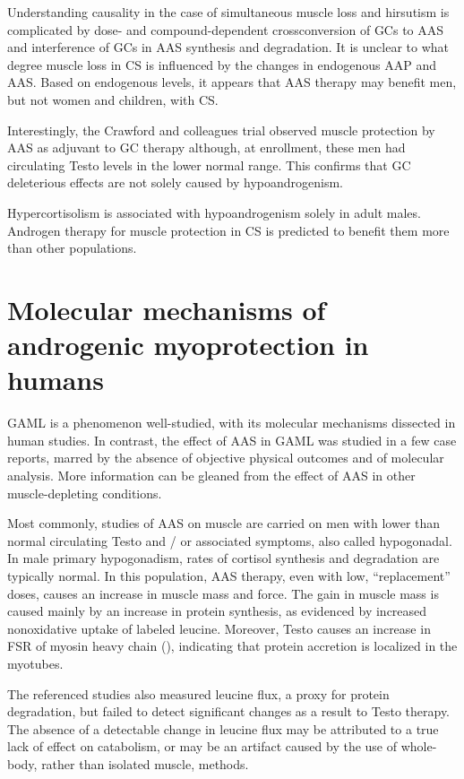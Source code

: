 \documentclass[12pt,english]{report}\usepackage[]{graphicx}\usepackage[]{color}
\begin{document}
Understanding causality in the case of simultaneous muscle loss and
hirsutism is complicated by dose- and compound-dependent crossconversion
of GCs to AAS and interference of GCs in AAS synthesis and degradation.
It is unclear to what degree muscle loss in CS is influenced by the
changes in endogenous AAP and AAS. Based on endogenous levels, it
appears that AAS therapy may benefit men, but not women and children,
with CS.

Interestingly, the Crawford and colleagues trial observed muscle protection
by AAS as adjuvant to GC therapy although, at enrollment, these men
had circulating Testo levels in the lower normal range\citep{crawford2003randomized}.
This confirms that GC deleterious effects are not solely caused by
hypoandrogenism.

Hypercortisolism is associated with hypoandrogenism solely in adult
males. Androgen therapy for muscle protection in CS is predicted to
benefit them more than other populations.


\section{Molecular mechanisms of androgenic myoprotection in humans}

GAML is a phenomenon well-studied, with its molecular mechanisms dissected
in human studies. In contrast, the effect of AAS in GAML was studied
in a few case reports, marred by the absence of objective physical
outcomes and of molecular analysis. More information can be gleaned
from the effect of AAS in other muscle-depleting conditions.

Most commonly, studies of AAS on muscle are carried on men with lower
than normal circulating Testo and / or associated symptoms, also called
hypogonadal. In male primary hypogonadism, rates of cortisol synthesis
and degradation are typically normal\citep{vierhapper2004production}.
In this population, AAS therapy, even with low, ``replacement''
doses, causes an increase in muscle mass and force\citep{bhasin1997testosterone,brodsky1996effects}.
The gain in muscle mass is caused mainly by an increase in protein
synthesis, as evidenced by increased nonoxidative uptake of labeled
leucine\citep{brodsky1996effects}. Moreover, Testo causes an increase
in FSR of myosin heavy chain (),
indicating that protein accretion is localized in the myotubes.

The referenced studies also measured leucine flux, a proxy for protein
degradation, but failed to detect significant changes as a result
to Testo therapy. The absence of a detectable change in leucine flux
may be attributed to a true lack of effect on catabolism, or may be
an artifact caused by the use of whole-body, rather than isolated
muscle, methods.
\end{document}
